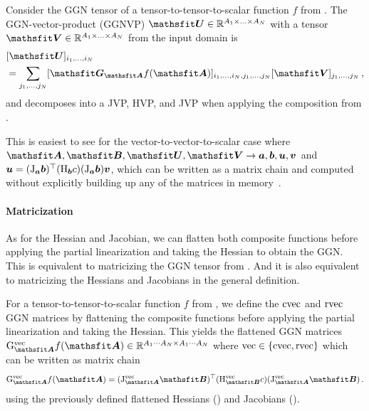 \begin{definition}\label{def:ggnvp}%
  Consider the GGN tensor of a tensor-to-tensor-to-scalar function $f$ from .
  The GGN-vector-product (GGNVP) $\tU \in \sR^{A_1 \times \ldots \times A_N}$ with a tensor $\tV \in \sR^{A_1 \times \ldots \times A_N}$ from the input domain is
  \begin{align*}
    & [\tU]_{i_1, \dots, i_N}
    \\
    & =
      \sum_{j_1, \dots, j_N}
      [\tG_{\tA} f(\tA)]_{i_1, \dots, i_N, j_1, \dots, j_N}
      [\tV]_{j_1, \dots, j_N}\,,
  \end{align*}
  and decomposes into a JVP, HVP, and JVP when applying the composition from .
\end{definition}
This is easiest to see for the vector-to-vector-to-scalar case where $\tA, \tB, \tU, \tV \to \va, \vb, \vu, \vv$ and ${\bm{u}} = (\mathrm{J}_{{\bm{a}}}{\bm{b}})^{\top} (\mathrm{H}_{{\bm{b}}} c) (\mathrm{J}_{{\bm{a}}} {\bm{b}}) {\bm{v}}$, which can be written as a matrix chain and computed without explicitly building up any of the matrices in memory~\cite{schraudolph2002fast}.

\paragraph{Matricization} As for the Hessian and Jacobian, we can flatten both composite functions before applying the partial linearization and taking the Hessian to obtain the GGN.
This is equivalent to matricizing the GGN tensor from .
And it is also equivalent to matricizing the Hessians and Jacobians in the general definition.

\begin{definition}\label{def:vec_ggns}
  For a tensor-to-tensor-to-scalar function $f$ from , we define the $\operatorname{cvec}$ and $\operatorname{rvec}$ GGN matrices by flattening the composite functions before applying the partial linearization and taking the Hessian. This yields the flattened GGN matrices $\ggn^{\vec}_{\tA}f(\tA) \in \sR^{A_1 \cdots A_N \times A_1 \cdots A_N}$ where $\operatorname{vec} \in \{\operatorname{cvec}, \operatorname{rvec}\}$ which can be written as matrix chain
  \begin{align*}
    \ggn^{\vec}_{\tA} f(\tA)
    =
    (\jac^{\vec}_{\tA} \tB)^{\top}
    (\hess^{\vec}_{\tB} c)
    (\jac^{\vec}_{\tA} \tB)\,.
  \end{align*}
  using the previously defined flattened Hessians () and Jacobians ().
\end{definition}


